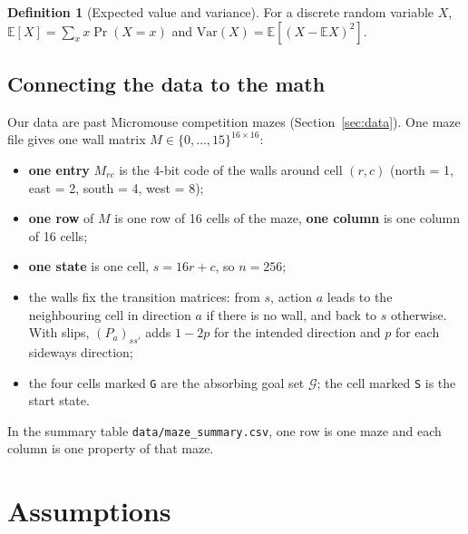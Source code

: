 \documentclass[10pt]{article}
\theoremstyle{definition}
\newtheorem{definition}{Definition}
\newcommand{\E}{\mathbb{E}}
\newcommand{\Gset}{\mathcal{G}}
\begin{document}
\begin{definition}[Expected value and variance]
For a discrete random variable $X$, $\E[X] = \sum_x x\Pr(X=x)$ and $\mathrm{Var}(X) = \E[(X-\E X)^2]$.
\end{definition}

\subsection{Connecting the data to the math}

Our data are past Micromouse competition mazes (Section~\ref{sec:data}). One maze file gives one wall matrix $M\in\{0,\dots,15\}^{16\times16}$:
\begin{itemize}[nosep]
\item \textbf{one entry} $M_{rc}$ is the 4-bit code of the walls around cell $(r,c)$ (north = 1, east = 2, south = 4, west = 8);
\item \textbf{one row} of $M$ is one row of 16 cells of the maze, \textbf{one column} is one column of 16 cells;
\item \textbf{one state} is one cell, $s = 16r+c$, so $n = 256$;
\item the walls fix the transition matrices: from $s$, action $a$ leads to the neighbouring cell in direction $a$ if there is no wall, and back to $s$ otherwise. With slips, $(P_a)_{ss'}$ adds $1-2p$ for the intended direction and $p$ for each sideways direction;
\item the four cells marked \texttt{G} are the absorbing goal set $\Gset$; the cell marked \texttt{S} is the start state.
\end{itemize}
In the summary table \texttt{data/maze\_summary.csv}, one row is one maze and each column is one property of that maze.

\section{Assumptions}
\end{document}
